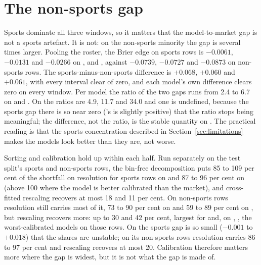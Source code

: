 \section{The non-sports gap}
\label{app:nonsports}
Sports dominate all three windows, so it matters that the model-to-market gap is
not a sports artefact. It is not: on the non-sports minority the gap is several
times larger. Pooling the roster, the Brier edge on sports rows is $-0.0061$, $-0.0131$ and
$-0.0266$ on \winA, \winB and \winC, against $-0.0739$, $-0.0727$ and $-0.0873$
on non-sports rows. The sports-minus-non-sports difference is $+0.068$, $+0.060$
and $+0.061$, with every interval clear of zero, and each model's own difference
clears zero on every window. Per model the ratio of the two gaps runs from 2.4 to
6.7 on \winB and \winC. On \winA the ratios are 4.9, 11.7 and 34.0 and one is
undefined, because the sports gap there is
so near zero (\mKimiKTwoFive's is slightly positive) that the ratio stops being
meaningful; the difference, not the ratio, is the stable quantity on \winA. The practical reading is that the sports
concentration described in Section~\ref{sec:limitations} makes the models look
better than they are, not worse.

Sorting and calibration hold up within each half. Run separately on the test
split's sports and non-sports rows, the bin-free decomposition puts 85 to 109 per
cent of the shortfall on resolution for sports rows on \winB and 87 to 96 per cent
on \winC (above 100 where the model is better calibrated than the market), and
cross-fitted rescaling recovers at most 18 and 11 per cent. On non-sports rows
resolution still carries most of it, 73 to 90 per cent on \winB and 59 to 89 per
cent on \winC, but rescaling recovers more: up to 30 and 42 per cent, largest for
\mDeepSeekVFourPro and, on \winC, \mGlmFiveOne, the worst-calibrated models on
those rows. On \winA the sports gap is so small ($-0.001$ to $+0.018$) that the
shares are unstable; on its non-sports rows resolution carries 86 to 97 per cent
and rescaling recovers at most 20. Calibration therefore matters more where the
gap is widest, but it is not what the gap is made of.

